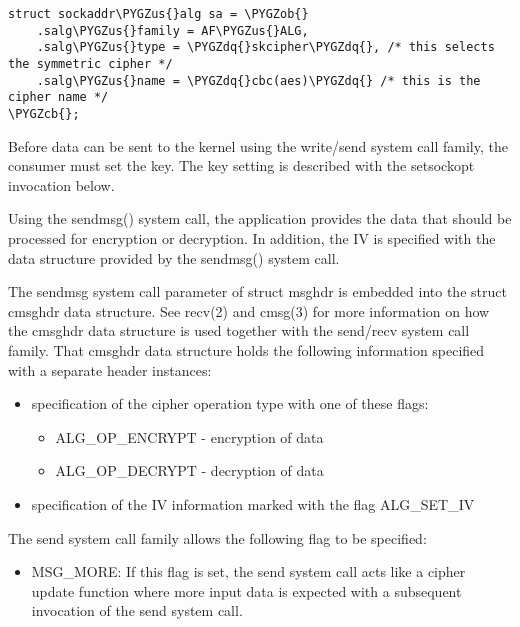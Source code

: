 \documentclass[a4paper,8pt,english]{sphinxmanual}
\def\PYGZus{\char`\_}
\def\PYGZob{\char`\{}
\def\PYGZcb{\char`\}}
\def\PYGZdq{\char`\"}
\begin{document}
\begin{Verbatim}[commandchars=\\\{\}]
struct sockaddr\PYGZus{}alg sa = \PYGZob{}
    .salg\PYGZus{}family = AF\PYGZus{}ALG,
    .salg\PYGZus{}type = \PYGZdq{}skcipher\PYGZdq{}, /* this selects the symmetric cipher */
    .salg\PYGZus{}name = \PYGZdq{}cbc(aes)\PYGZdq{} /* this is the cipher name */
\PYGZcb{};
\end{Verbatim}

Before data can be sent to the kernel using the write/send system call
family, the consumer must set the key. The key setting is described with
the setsockopt invocation below.

Using the sendmsg() system call, the application provides the data that
should be processed for encryption or decryption. In addition, the IV is
specified with the data structure provided by the sendmsg() system call.

The sendmsg system call parameter of struct msghdr is embedded into the
struct cmsghdr data structure. See recv(2) and cmsg(3) for more
information on how the cmsghdr data structure is used together with the
send/recv system call family. That cmsghdr data structure holds the
following information specified with a separate header instances:
\begin{itemize}
\item {} 
specification of the cipher operation type with one of these flags:
\begin{itemize}
\item {} 
ALG\_OP\_ENCRYPT - encryption of data

\item {} 
ALG\_OP\_DECRYPT - decryption of data

\end{itemize}

\item {} 
specification of the IV information marked with the flag ALG\_SET\_IV

\end{itemize}

The send system call family allows the following flag to be specified:
\begin{itemize}
\item {} 
MSG\_MORE: If this flag is set, the send system call acts like a
cipher update function where more input data is expected with a
subsequent invocation of the send system call.

\end{itemize}
\end{document}
